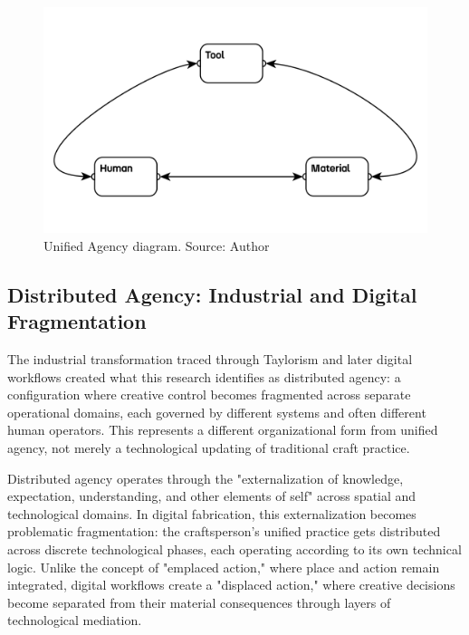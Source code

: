 \begin{figure}[h]
\centering
\includegraphics[width=1\textwidth]{figures/chapter1/traditional making.png}
\caption{Unified Agency diagram. Source: Author}
\label{fig:unified_agency}
\end{figure}

\subsection{Distributed Agency: Industrial and Digital Fragmentation}

The industrial transformation traced through Taylorism and later digital workflows created what this research identifies as distributed agency: a configuration where creative control becomes fragmented across separate operational domains, each governed by different systems and often different human operators. This represents a different organizational form from unified agency, not merely a technological updating of traditional craft practice.

Distributed agency operates through the "externalization of knowledge, expectation, understanding, and other elements of self" across spatial and technological domains. In digital fabrication, this externalization becomes problematic fragmentation: the craftsperson's unified practice gets distributed across discrete technological phases, each operating according to its own technical logic. Unlike the concept of "emplaced action," where place and action remain integrated, digital workflows create a "displaced action," where creative decisions become separated from their material consequences through layers of technological mediation.

